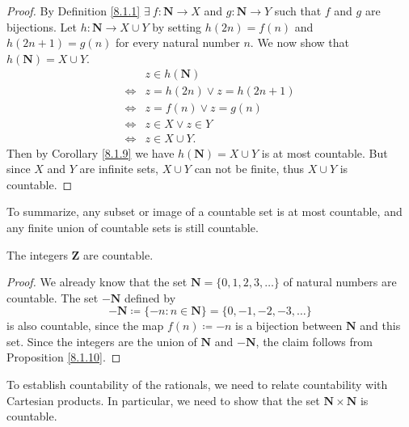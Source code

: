 \begin{proof}
    By Definition \ref{8.1.1} \(\exists\ f : \mathbf{N} \to X\) and \(g : \mathbf{N} \to Y\) such that \(f\) and \(g\) are bijections.
    Let \(h : \mathbf{N} \to X \cup Y\) by setting \(h(2n) = f(n)\) and \(h(2n + 1) = g(n)\) for every natural number \(n\).
    We now show that \(h(\mathbf{N}) = X \cup Y\).
    \begin{align*}
             & z \in h(\mathbf{N})          \\
        \iff & z = h(2n) \lor z = h(2n + 1) \\
        \iff & z = f(n) \lor z = g(n)       \\
        \iff & z \in X \lor z \in Y         \\
        \iff & z \in X \cup Y.
    \end{align*}
    Then by Corollary \ref{8.1.9} we have \(h(\mathbf{N}) = X \cup Y\) is at most countable.
    But since \(X\) and \(Y\) are infinite sets, \(X \cup Y\) can not be finite, thus \(X \cup Y\) is countable.
\end{proof}

\begin{note}
    To summarize, any subset or image of a countable set is at most countable, and any finite union of countable sets is still countable.
\end{note}

\begin{corollary}\label{8.1.11}
    The integers \(\mathbf{Z}\) are countable.
\end{corollary}

\begin{proof}
    We already know that the set \(\mathbf{N} = \{0, 1, 2, 3, \dots\}\) of natural numbers are countable.
    The set \(-\mathbf{N}\) defined by
    \[
        -\mathbf{N} \coloneqq \{-n : n \in \mathbf{N}\} = \{0, -1, -2, -3, \dots\}
    \]
    is also countable, since the map \(f(n) \coloneqq -n\) is a bijection between \(\mathbf{N}\) and this set.
    Since the integers are the union of \(\mathbf{N}\) and \(-\mathbf{N}\), the claim follows from Proposition \ref{8.1.10}.
\end{proof}

\begin{note}
    To establish countability of the rationals, we need to relate countability with Cartesian products.
    In particular, we need to show that the set \(\mathbf{N} \times \mathbf{N}\) is countable.
\end{note}

